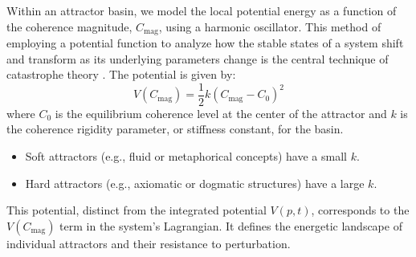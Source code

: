 Within an attractor basin, we model the local potential energy as a function of the coherence magnitude, \(C_{\text{mag}}\), using a harmonic oscillator. This method of employing a potential function to analyze how the stable states of a system shift and transform as its underlying parameters change is the central technique of catastrophe theory \autocite{Thom1975}. The potential is given by:
\begin{equation}\label{eq:attractor_potential}
V(C_{\text{mag}}) = \frac{1}{2}k(C_{\text{mag}} - C_0)^2
\end{equation}
where \(C_0\) is the equilibrium coherence level at the center of the attractor and \(k\) is the coherence rigidity parameter, or stiffness constant, for the basin.
\begin{itemize}
    \item Soft attractors (e.g., fluid or metaphorical concepts) have a small \(k\).
    \item Hard attractors (e.g., axiomatic or dogmatic structures) have a large \(k\).
\end{itemize}
This potential, distinct from the integrated potential \(V(p,t)\), corresponds to the \(V(C_{\text{mag}})\) term in the system's Lagrangian. It defines the energetic landscape of individual attractors and their resistance to perturbation. 